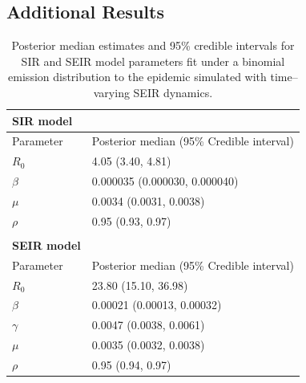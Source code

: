 \subsection{Additional Results}
\label{subsec:bda_misspec_additional_results}
\begin{table}[htbp]
	\centering
	\begin{tabular}{ll}
		\textbf{SIR model} & \\
		\hline\hline
		Parameter & Posterior median (95\% Credible interval) \\ 
		\hline
		$ R_0 $ & 4.05 (3.40, 4.81) \\ 
		$\beta $ & 0.000035 (0.000030, 0.000040) \\ 
		$ \mu $ & 0.0034 (0.0031, 0.0038) \\ 
		$ \rho $ & 0.95 (0.93, 0.97) \\
		\hline & \\
		\textbf{SEIR model} & \\
		\hline\hline
		Parameter & Posterior median (95\% Credible interval) \\ 
		\hline 
		$ R_0 $ & 23.80 (15.10, 36.98) \\ 
		$ \beta $ & 0.00021 (0.00013, 0.00032) \\ 
		$ \gamma $ & 0.0047 (0.0038, 0.0061) \\ 
		$ \mu $ & 0.0035 (0.0032, 0.0038) \\ 
		$ \rho $ & 0.95 (0.94, 0.97) \\ 
		\hline
	\end{tabular}
	\caption[Simulation 2 posterior estimates for SIR and SEIR model parameters.]{Posterior median estimates and 95\% credible intervals for SIR and SEIR model parameters fit under a binomial emission distribution to the epidemic simulated with time--varying SEIR dynamics.}
\end{table}

